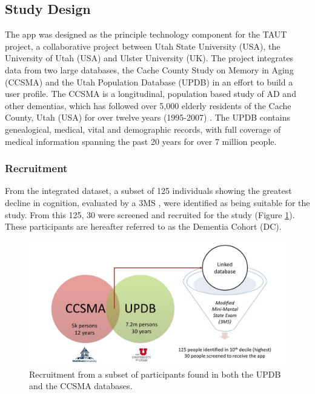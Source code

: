 \subsection{Study Design}
The app was designed as the principle technology component for the TAUT project, a collaborative project between Utah State University (USA), the University of Utah (USA) and Ulster University (UK).
The project integrates data from two large databases, the Cache County Study on Memory in Aging (CCSMA) and the Utah Population Database (UPDB) in an effort to build a user profile. The CCSMA is a longitudinal, population based study of AD and other dementias, which has followed over 5,000 elderly residents of the Cache County, Utah (USA) for over twelve years (1995-2007) \cite{Tschanz2013}. The UPDB contains genealogical, medical, vital and demographic records, with full coverage of medical information spanning the past 20 years for over 7 million people.

\subsubsection{Recruitment}
From the integrated dataset, a subset of 125 individuals showing the greatest decline in cognition, evaluated by a 3MS \cite{Tschanz2002}, were identified as being suitable for the study. From this 125, 30 were screened and recruited for the study (Figure \ref{fig: taut-recruitment}). These participants are hereafter referred to as the Dementia Cohort (DC).

\begin{figure}[h]
    \centering
        \includegraphics[scale=0.3, angle=0]{Files/treatment-study-1/figures/taut-recruitment}
        \caption{Recruitment from a subset of participants found in both the UPDB and the CCSMA databases.}
        \label{fig: taut-recruitment}
\end{figure}

